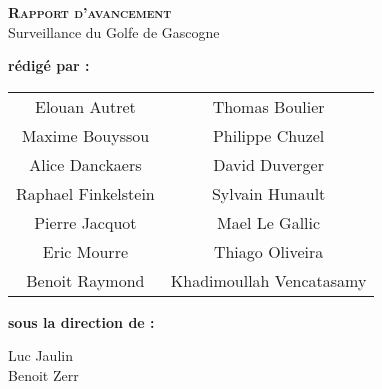 
\begingroup
\thispagestyle{empty}
\begin{center}
\vspace*{2cm}
{\Huge \textsc{\textbf{Rapport d'avancement}}}\\
\vspace*{2cm}
{\huge Surveillance du Golfe de Gascogne}\par %
\end{center}
\vspace*{4cm}

\textbf{\huge rédigé par :} 

\begin{center}
\begin{tabular}{cc}


Elouan Autret & Thomas Boulier\\
Maxime Bouyssou & Philippe Chuzel\\
Alice Danckaers & David Duverger\\
Raphael Finkelstein & Sylvain Hunault\\
Pierre Jacquot & Mael Le Gallic\\
Eric Mourre & Thiago Oliveira\\
Benoit Raymond & Khadimoullah Vencatasamy\\
\end{tabular}
\end{center}


\vspace*{1cm}

{\huge \textbf{sous la direction de :}}\\
\begin{center}
{\huge
Luc Jaulin\\
Benoit Zerr\\}
\end{center}
\endgroup

